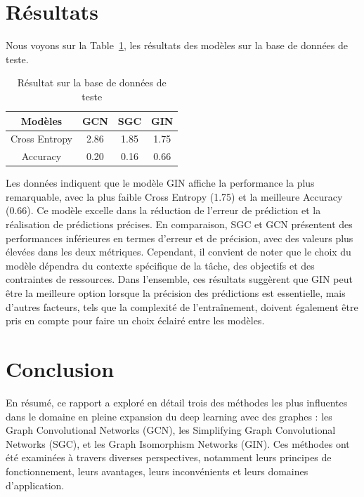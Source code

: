 \documentclass[a4paper]{article}
\begin{document}
\section{Résultats}

Nous voyons sur la Table~\ref{tab:test}, les résultats des modèles sur la base de données de teste. 

\begin{table}[ht]
    \centering
    \begin{tabular}{|c|c|c|c|}
        \hline
        Modèles & GCN & SGC & GIN \\
        \hline
        Cross Entropy & 2.86 & 1.85 & 1.75 \\
        \hline
        Accuracy & 0.20 & 0.16 & 0.66\\
        \hline
    \end{tabular}
    \caption{Résultat sur la base de données de teste}
    \label{tab:test}
\end{table}

Les données indiquent que le modèle GIN affiche la performance la plus remarquable, avec la plus faible Cross Entropy (1.75) et la meilleure Accuracy (0.66). Ce modèle excelle dans la réduction de l'erreur de prédiction et la réalisation de prédictions précises. En comparaison, SGC et GCN présentent des performances inférieures en termes d'erreur et de précision, avec des valeurs plus élevées dans les deux métriques. Cependant, il convient de noter que le choix du modèle dépendra du contexte spécifique de la tâche, des objectifs et des contraintes de ressources. Dans l'ensemble, ces résultats suggèrent que GIN peut être la meilleure option lorsque la précision des prédictions est essentielle, mais d'autres facteurs, tels que la complexité de l'entraînement, doivent également être pris en compte pour faire un choix éclairé entre les modèles.

\section{Conclusion}
En résumé, ce rapport a exploré en détail trois des méthodes les plus influentes dans le domaine en pleine expansion du deep learning avec des graphes : les Graph Convolutional Networks (GCN), les Simplifying Graph Convolutional Networks (SGC), et les Graph Isomorphism Networks (GIN). Ces méthodes ont été examinées à travers diverses perspectives, notamment leurs principes de fonctionnement, leurs avantages, leurs inconvénients et leurs domaines d'application.
\end{document}

